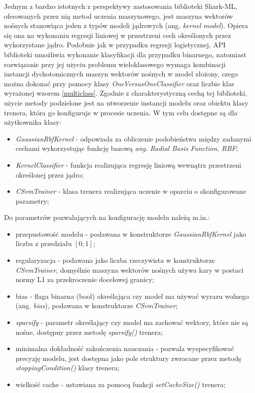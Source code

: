 Jednym z bardzo istotnych z perspektywy zastosowania biblioteki Shark-ML, oferowanych przez nią metod uczenia maszynowego, jest maszyna wektorów nośnych stanowiąca jeden z typów modeli jądrowych (ang. \textit{kernel model}). Opiera się ona na wykonaniu regresji liniowej w przestrzeni cech określonych przez wykorzystane jądro. Podobnie jak w przypadku regresji logistycznej, API biblioteki umożliwia wykonanie klasyfikacji dla przypadku binarnego, natomiast rozwiązanie przy jej użyciu problemu wieloklasowego wymaga kombinacji instancji dychotomicznych maszyn wektorów nośnych w model złożony, czego można dokonać przy pomocy klasy \textit{OneVersusOneClassifier} oraz liczbie klas wyrażonej wzorem \ref{multiclass}. Zgodnie z charakterystyczną cechą tej biblioteki, użycie metody podzielone jest na utworzenie instancji modelu oraz obiektu klasy trenera, która go konfiguruje w procesie uczenia. W tym celu dostępne są dla użytkownika klasy:

\begin{itemize}
	\item \textit{GaussianRbfKernel} - odpowiada za obliczenie podobieństwa między zadanymi cechami wykorzystując funkcję bazową \textit{ang. Radial Basis Function, RBF};
	\item \textit{KernelClassifier} - funkcja realizująca regresję liniową wewnątrz przestrzeni określonej przez jądro;
	\item \textit{CSvmTrainer} - klasa trenera realizująca uczenie w oparciu o skonfigurowane parametry;
\end{itemize}

Do parametrów pozwalających na konfigurację modelu należą m.in.:

\begin{itemize}
	\item przepustowość modelu - podawana w konstruktorze \textit{GaussianRbfKernel} jako liczba z przedziału $[0; 1]$;
	\item regularyzacja - podawana jako liczba rzeczywista w konstruktorze \textit{CSvmTrainer}, domyślnie maszyna wektorów nośnych używa kary w postaci normy L1 za przekroczenie docelowej granicy;
	\item bias - flaga binarna (bool) określająca czy model ma używać wyrazu wolnego (ang. \textit{bias}), podawana w konstruktorze \textit{CSvmTrainer};
	\item \textit{sparsify} - parametr określający czy model ma zachować wektory, które nie są nośne, dostępny przez metodę \textit{sparsify()} trenera;
	\item minimalna dokładność zakończenia nauczania - pozwala wyspecyfikować precyzję modelu, jest dostępna jako pole struktury zwracane przez metodę \textit{stoppingCondition()} klasy trenera;
	\item wielkość cache - ustawiana za pomocą funkcji \textit{setCacheSize()} trenera;
\end{itemize}

